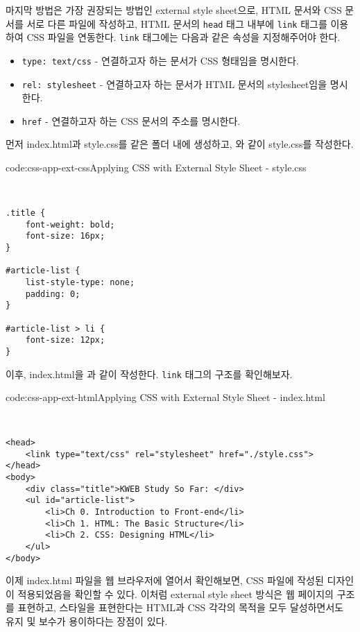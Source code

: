 마지막 방법은 가장 권장되는 방법인 external style sheet으로, HTML 문서와 CSS 문서를 서로 다른 파일에 작성하고, HTML 문서의 \verb|head| 태그 내부에 \verb|link| 태그를 이용하여 CSS 파일을 연동한다. \verb|link| 태그에는 다음과 같은 속성을 지정해주어야 한다.

\begin{itemize}
    \item \verb|type: text/css| - 연결하고자 하는 문서가 CSS 형태임을 명시한다.
    \item \verb|rel: stylesheet| - 연결하고자 하는 문서가 HTML 문서의 stylesheet임을 명시한다.
    \item \verb|href| - 연결하고자 하는 CSS 문서의 주소를 명시한다.
\end{itemize}

먼저 index.html과 style.css를 같은 폴더 내에 생성하고, 와 같이 style.css를 작성한다.

\begin{codeenv}{code:css-app-ext-css}{Applying CSS with External Style Sheet - style.css}\begin{verbatim}


.title {
    font-weight: bold;
    font-size: 16px;
}

#article-list {
    list-style-type: none;
    padding: 0;
}

#article-list > li {
    font-size: 12px;
}
\end{verbatim}
\end{codeenv}

이후, index.html을 과 같이 작성한다. \verb|link| 태그의 구조를 확인해보자.

\begin{codeenv}{code:css-app-ext-html}{Applying CSS with External Style Sheet - index.html}\begin{verbatim}


<head>
    <link type="text/css" rel="stylesheet" href="./style.css">
</head>
<body>
    <div class="title">KWEB Study So Far: </div>
    <ul id="article-list">
        <li>Ch 0. Introduction to Front-end</li>
        <li>Ch 1. HTML: The Basic Structure</li>
        <li>Ch 2. CSS: Designing HTML</li>
    </ul>
</body>
\end{verbatim}
\end{codeenv}

이제 index.html 파일을 웹 브라우저에 열어서 확인해보면, CSS 파일에 작성된 디자인이 적용되었음을 확인할 수 있다. 이처럼 external style sheet 방식은 웹 페이지의 구조를 표현하고, 스타일을 표현한다는 HTML과 CSS 각각의 목적을 모두 달성하면서도 유지 및 보수가 용이하다는 장점이 있다. 
